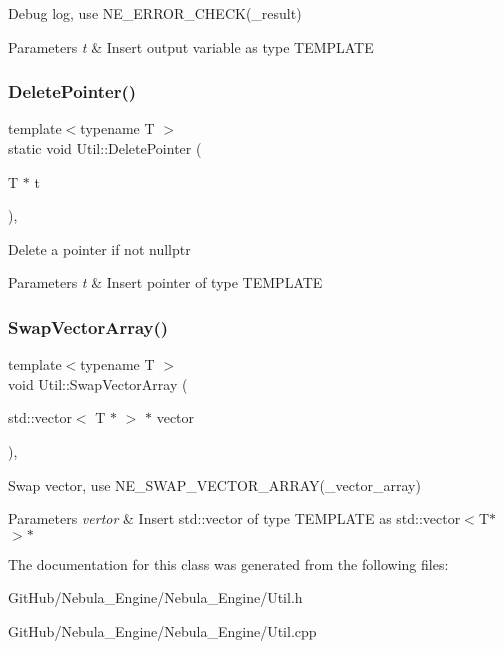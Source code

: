 Debug log, use N\+E\+\_\+\+E\+R\+R\+O\+R\+\_\+\+C\+H\+E\+C\+K(\+\_\+result) 
\begin{DoxyParams}{Parameters}
{\em t} & Insert output variable as type T\+E\+M\+P\+L\+A\+TE \\
\hline
\end{DoxyParams}
\mbox{\label{class_util_a3f368c839c02137364295ed412f5b715}} 
\subsubsection{\texorpdfstring{DeletePointer()}{DeletePointer()}}
{\footnotesize\ttfamily template$<$typename T $>$ \\
static void Util\+::\+Delete\+Pointer (\begin{DoxyParamCaption}\item[{T $\ast$}]{t }\end{DoxyParamCaption})\hspace{0.3cm}{\ttfamily [inline]}, {\ttfamily [static]}}

Delete a pointer if not nullptr 
\begin{DoxyParams}{Parameters}
{\em t} & Insert pointer of type T\+E\+M\+P\+L\+A\+TE \\
\hline
\end{DoxyParams}
\mbox{\label{class_util_affee8f024e5e4bd88fb0bd79e37c2186}} 
\subsubsection{\texorpdfstring{SwapVectorArray()}{SwapVectorArray()}}
{\footnotesize\ttfamily template$<$typename T $>$ \\
void Util\+::\+Swap\+Vector\+Array (\begin{DoxyParamCaption}\item[{std\+::vector$<$ T $\ast$ $>$ $\ast$}]{vector }\end{DoxyParamCaption})\hspace{0.3cm}{\ttfamily [inline]}, {\ttfamily [static]}}

Swap vector, use N\+E\+\_\+\+S\+W\+A\+P\+\_\+\+V\+E\+C\+T\+O\+R\+\_\+\+A\+R\+R\+A\+Y(\+\_\+vector\+\_\+array) 
\begin{DoxyParams}{Parameters}
{\em vertor} & Insert std\+::vector of type T\+E\+M\+P\+L\+A\+TE as std\+::vector$<$\+T$\ast$$>$$\ast$ \\
\hline
\end{DoxyParams}


The documentation for this class was generated from the following files\+:\begin{DoxyCompactItemize}
\item 
Git\+Hub/\+Nebula\+\_\+\+Engine/\+Nebula\+\_\+\+Engine/Util.\+h\item 
Git\+Hub/\+Nebula\+\_\+\+Engine/\+Nebula\+\_\+\+Engine/Util.\+cpp\end{DoxyCompactItemize}
